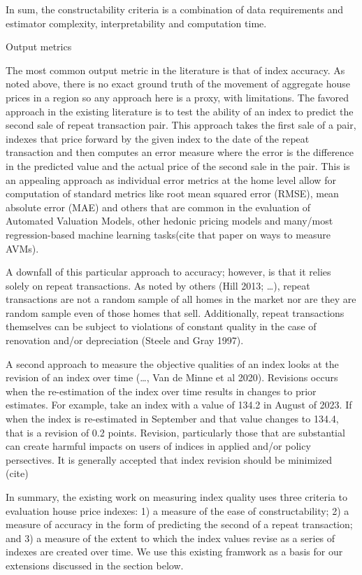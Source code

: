 \documentclass[
]{article}
\begin{document}
In sum, the constructability criteria is a combination of data
requirements and estimator complexity, interpretability and computation
time.

Output metrics

The most common output metric in the literature is that of index
accuracy. As noted above, there is no exact ground truth of the movement
of aggregate house prices in a region so any approach here is a proxy,
with limitations. The favored approach in the existing literature is to
test the ability of an index to predict the second sale of repeat
transaction pair. This approach takes the first sale of a pair, indexes
that price forward by the given index to the date of the repeat
transaction and then computes an error measure where the error is the
difference in the predicted value and the actual price of the second
sale in the pair. This is an appealing approach as individual error
metrics at the home level allow for computation of standard metrics like
root mean squared error (RMSE), mean absolute error (MAE) and others
that are common in the evaluation of Automated Valuation Models, other
hedonic pricing models and many/most regression-based machine learning
tasks(cite that paper on ways to measure AVMs).

A downfall of this particular approach to accuracy; however, is that it
relies solely on repeat transactions. As noted by others (Hill 2013;
\ldots), repeat transactions are not a random sample of all homes in the
market nor are they are random sample even of those homes that sell.
Additionally, repeat transactions themselves can be subject to
violations of constant quality in the case of renovation and/or
depreciation (Steele and Gray 1997).

A second approach to measure the objective qualities of an index looks
at the revision of an index over time (\ldots, Van de Minne et al 2020).
Revisions occurs when the re-estimation of the index over time results
in changes to prior estimates. For example, take an index with a value
of 134.2 in August of 2023. If when the index is re-estimated in
September and that value changes to 134.4, that is a revision of 0.2
points. Revision, particularly those that are substantial can create
harmful impacts on users of indices in applied and/or policy
persectives. It is generally accepted that index revision should be
minimized (cite)

In summary, the existing work on measuring index quality uses three
criteria to evaluation house price indexes: 1) a measure of the ease of
constructability; 2) a measure of accuracy in the form of predicting the
second of a repeat transaction; and 3) a measure of the extent to which
the index values revise as a series of indexes are created over time. We
use this existing framwork as a basis for our extensions discussed in
the section below.
\end{document}
